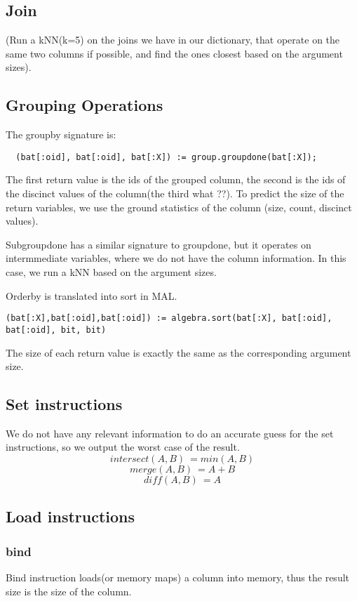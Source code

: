 \subsection{Join}
(Run a kNN(k=5) on the joins we have in our dictionary,
that operate on the same two columns if possible,
and find the ones closest based on the argument sizes).

\subsection{Grouping Operations}
The groupby signature is:
\begin{verbatim}
  (bat[:oid], bat[:oid], bat[:X]) := group.groupdone(bat[:X]);
\end{verbatim}
The first return value is the ids of the grouped column, the second is
the ids of the discinct values of the column(the third what ??). To predict
the size of the return variables, we use the ground statistics of the column
(size, count, discinct values).

Subgroupdone has a similar signature to groupdone, but it operates on intermmediate
variables, where we do not have the column information. In this case, we run a
kNN based on the argument sizes.

Orderby is translated into sort in MAL.
\begin{verbatim}
(bat[:X],bat[:oid],bat[:oid]) := algebra.sort(bat[:X], bat[:oid], bat[:oid], bit, bit)
\end{verbatim}
The size of each return value is exactly the same as the corresponding argument size.

\subsection{Set instructions}
We do not have any relevant information to do an accurate guess for the
set instructions, so we output the worst case of the result.
$$ intersect(A,B) ~= min(A,B)$$
$$ merge(A,B) ~= A+B $$
$$ diff(A,B) ~= A $$

\subsection{Load instructions}
\subsubsection{bind}
Bind instruction loads(or memory maps) a column into memory,
thus the result size is the size of the column.
